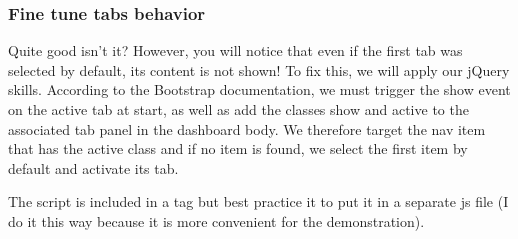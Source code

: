 \documentclass[]{book}
\newenvironment{Shaded}{\begin{snugshade}}{\end{snugshade}}
\newcommand{\AttributeTok}[1]{\textcolor[rgb]{0.77,0.63,0.00}{#1}}
\newcommand{\CommentTok}[1]{\textcolor[rgb]{0.56,0.35,0.01}{\textit{#1}}}
\newcommand{\ControlFlowTok}[1]{\textcolor[rgb]{0.13,0.29,0.53}{\textbf{#1}}}
\newcommand{\DecValTok}[1]{\textcolor[rgb]{0.00,0.00,0.81}{#1}}
\newcommand{\KeywordTok}[1]{\textcolor[rgb]{0.13,0.29,0.53}{\textbf{#1}}}
\newcommand{\NormalTok}[1]{#1}
\newcommand{\OperatorTok}[1]{\textcolor[rgb]{0.81,0.36,0.00}{\textbf{#1}}}
\newcommand{\SpecialCharTok}[1]{\textcolor[rgb]{0.00,0.00,0.00}{#1}}
\newcommand{\StringTok}[1]{\textcolor[rgb]{0.31,0.60,0.02}{#1}}
\newcommand{\VariableTok}[1]{\textcolor[rgb]{0.00,0.00,0.00}{#1}}
\newcommand{\VerbatimStringTok}[1]{\textcolor[rgb]{0.31,0.60,0.02}{#1}}
\begin{document}
\hypertarget{fine-tune-tabs-behavior}{%
\subsubsection{Fine tune tabs behavior}\label{fine-tune-tabs-behavior}}

Quite good isn't it? However, you will notice that even if the first tab was selected by default, its content is not shown! To fix this, we will apply our jQuery skills. According to the Bootstrap documentation, we must trigger the show event on the active tab at start, as well as add the classes show and active to the associated tab panel in the dashboard body. We therefore target the nav item that has the active class and if no item is found, we select the first item by default and activate its tab.

\begin{Shaded}
\end{Shaded}

The script is included in a tag but best practice it to put it in a separate js file (I do it this way because it is more convenient for the demonstration).
\end{document}
